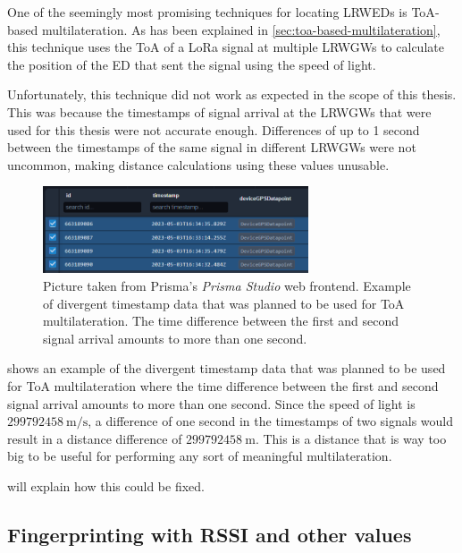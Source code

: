 One of the seemingly most promising techniques for locating \aclp{LRWED} is \ac{ToA}-based multilateration.
As has been explained in \cref{sec:toa-based-multilateration}, this technique uses the \acl{ToA} of a \ac{LoRa} signal at multiple \aclp{LRWGW} to calculate the position of the \acl{ED} that sent the signal using the speed of light.

Unfortunately, this technique did not work as expected in the scope of this thesis.
This was because the timestamps of signal arrival at the \aclp{LRWGW} that were used for this thesis were not accurate enough.
Differences of up to 1 second between the timestamps of the same signal in different \aclp{LRWGW} were not uncommon, making distance calculations using these values unusable.

\begin{figure}[htbp]
    \centering
    \includegraphics[width=0.7\textwidth]{pictures/multilateration/toa_bad_data_example_prisma_studio.png}
    \caption{
        Picture taken from Prisma's \emph{Prisma Studio} web frontend.
        Example of divergent timestamp data that was planned to be used for \ac{ToA} multilateration.
        The time difference between the first and second signal arrival amounts to more than one second.
    }\label{fig:toa-bad-data-example}
\end{figure}

 shows an example of the divergent timestamp data that was planned to be used for \ac{ToA} multilateration where the time difference between the first and second signal arrival amounts to more than one second.
Since the speed of light is $299792458\ \mathrm{m/s}$, a difference of one second in the timestamps of two signals would result in a distance difference of $299792458\ \mathrm{m}$.
This is a distance that is way too big to be useful for performing any sort of meaningful multilateration.

 will explain how this could be fixed.

\subsection{Fingerprinting with \acs{RSSI} and other values}\label{sec:fingerprinting-implementation}

